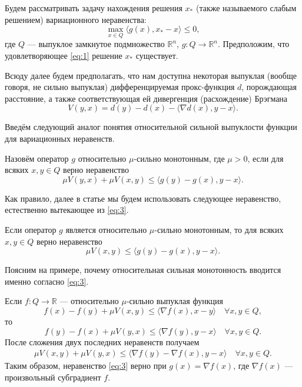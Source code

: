     Будем рассматривать задачу нахождения решения $x_*$ (также называемого слабым решением) вариационного неравенства: 
    \begin{equation}\label{eq:1}
    \max_{x \in Q} \langle g(x), x_* - x \rangle \leq 0,
    \end{equation}
    где $Q$ --- выпуклое замкнутое подмножество $\mathbb{R}^n$,
    $g: Q \longrightarrow \mathbb{R}^n$. Предположим, что удовлетворяющее \eqref{eq:1} решение $x_*$ существует.

    Всюду далее будем предполагать, что нам доступна некоторая выпуклая (вообще говоря, не сильно выпуклая) дифференцируемая прокс-функция $d$, порождающая расстояние, а также соответствующая ей дивергенция (расхождение) Брэгмана \cite{Bauschke}
    \begin{equation}\label{Brg_form}
    V(y, x) = d(y) - d(x) - \langle \nabla d(x), y - x \rangle.
    \end{equation}

    Введём следующий аналог понятия относительной сильной выпуклости функции \cite{Lu_Nesterov_2018} для вариационных неравенств.
    \begin{definition}\label{DefRelStrongMonot}
    Назовём оператор $g$ относительно $\mu$-сильно монотонным, где $\mu >0$, если для всяких $x, y \in Q$ верно неравенство
    	\begin{equation}\label{eq:3}
    	 	\mu V(y, x) + \mu V(x, y) \leq \langle g(y) - g(x), y - x \rangle.
    	 \end{equation}
    \end{definition}
    Как правило, далее в статье мы будем использовать следующее неравенство, естественно вытекающее из \eqref{eq:3}.
    \begin{remark}
    Если оператор $g$ является  относительно $\mu$-сильно монотонным, то для всяких $x, y \in Q$ верно неравенство
    $$
    	 	\mu V(x, y) \leq \langle g(y) - g(x), y - x \rangle.
    $$
    \end{remark}

    Поясним на примере, почему относительная сильная монотонность вводится име\-нно согласно  \eqref{eq:3}.
    \begin{example}
    	Если $f: Q \longrightarrow \mathbb{R}$ --- относительно $\mu$-сильно выпуклая функция
    	\begin{equation}\label{eqrelativestorngconv}
    	f(x) - f(y) + \mu V(x, y) \leq \langle \nabla{f(x)}, x - y \rangle \quad   \forall x, y \in Q,
    	\end{equation}
    	то
    	\begin{equation}
    	f(y) - f(x) + \mu V(y, x) \leq \langle \nabla{f(y)}, y - x \rangle \quad   \forall x, y \in Q.
    	\end{equation}
    	После сложения двух последних неравенств получаем
    	\begin{align*}
    	\mu V(x, y) + \mu V(y, x)\leq \langle \nabla{f(y)} - \nabla{f(x)}, y - x \rangle \quad  \forall x, y \in Q.
    	\end{align*}
    	Таким образом, неравенство \eqref{eq:3} верно при $g(x) = \nabla{f(x)}$, где $\nabla{f(x)}$ --- произвольный субградиент $f$.
    \end{example}

